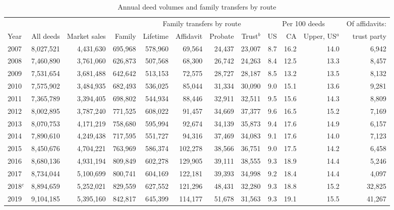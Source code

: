 \begin{table}[!t]\centering
\caption{Annual deed volumes and family transfers by route}
\label{tab:volumes}
{\scriptsize\setlength{\tabcolsep}{2.5pt}
\begin{adjustbox}{max width=\textwidth}\begin{tabular}{lrrrrrrrrrrr}\toprule
 & & & & \multicolumn{4}{c}{Family transfers by route} & \multicolumn{3}{c}{Per 100 deeds} & Of affidavits: \\
\cmidrule(lr){5-8}\cmidrule(lr){9-11}
Year & All deeds & Market sales & Family & Lifetime & Affidavit & Probate & Trust$^{b}$ & US & CA & Upper, US$^{a}$ & trust party \\
\midrule
2007 & 8,027,521 & 4,431,630 & 695,968 & 578,960 & 69,564 & 24,437 & 23,007 & 8.7 & 16.2 & 14.0 & 6,942 \\
2008 & 7,460,890 & 3,761,060 & 626,873 & 507,568 & 68,300 & 26,742 & 24,263 & 8.4 & 12.5 & 13.3 & 8,457 \\
2009 & 7,531,654 & 3,681,488 & 642,642 & 513,153 & 72,575 & 28,727 & 28,187 & 8.5 & 13.2 & 13.5 & 8,132 \\
2010 & 7,575,902 & 3,484,935 & 682,493 & 536,025 & 85,044 & 31,334 & 30,090 & 9.0 & 15.1 & 13.6 & 9,281 \\
2011 & 7,365,789 & 3,394,405 & 698,802 & 544,934 & 88,446 & 32,911 & 32,511 & 9.5 & 15.6 & 14.3 & 8,809 \\
2012 & 8,002,895 & 3,787,240 & 771,525 & 608,022 & 91,457 & 34,669 & 37,377 & 9.6 & 16.5 & 15.2 & 7,169 \\
2013 & 8,070,753 & 4,171,219 & 758,680 & 595,994 & 92,674 & 34,139 & 35,873 & 9.4 & 17.6 & 14.9 & 6,157 \\
2014 & 7,890,610 & 4,249,438 & 717,595 & 551,727 & 94,316 & 37,469 & 34,083 & 9.1 & 17.6 & 14.0 & 7,123 \\
2015 & 8,450,676 & 4,704,221 & 763,969 & 586,374 & 102,278 & 38,566 & 36,751 & 9.0 & 17.5 & 14.2 & 6,458 \\
2016 & 8,680,136 & 4,931,194 & 809,849 & 602,278 & 129,905 & 39,111 & 38,555 & 9.3 & 18.9 & 14.4 & 5,246 \\
2017 & 8,734,044 & 5,100,699 & 800,741 & 604,169 & 122,181 & 39,393 & 34,998 & 9.2 & 18.4 & 14.4 & 4,097 \\
2018$^{c}$ & 8,894,659 & 5,252,021 & 829,559 & 627,552 & 121,296 & 48,431 & 32,280 & 9.3 & 18.8 & 15.2 & 32,825 \\
2019 & 9,104,185 & 5,395,160 & 842,817 & 645,399 & 114,177 & 51,678 & 31,563 & 9.3 & 19.1 & 15.5 & 41,267 \\

\end{tabular}
\end{adjustbox}}
\end{table}

